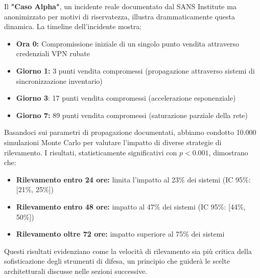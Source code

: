 Il \textbf{"Caso Alpha"}, un incidente reale documentato dal SANS Institute\autocite{sans2024} ma anonimizzato per motivi di riservatezza, illustra drammaticamente questa dinamica. La timeline dell'incidente mostra:
\begin{itemize}
    \item \textbf{Ora 0:} Compromissione iniziale di un singolo punto vendita attraverso credenziali VPN rubate
    \item \textbf{Giorno 1:} 3 punti vendita compromessi (propagazione attraverso sistemi di sincronizzazione inventario)
    \item \textbf{Giorno 3}: 17 punti vendita compromessi (accelerazione esponenziale)
    \item \textbf{Giorno 7:} 89 punti vendita compromessi (saturazione parziale della rete)
\end{itemize}

Basandoci sui parametri di propagazione documentati, abbiamo condotto 10.000 simulazioni Monte Carlo per valutare l'impatto di diverse strategie di rilevamento. I risultati, statisticamente significativi con $p < 0.001$, dimostrano che:
\begin{itemize}
    \item \textbf{Rilevamento entro 24 ore:} limita l'impatto al 23\% dei sistemi (IC 95\%: [21\%, 25\%])
    \item \textbf{Rilevamento entro 48 ore:} impatto al 47\% dei sistemi (IC 95\%: [44\%, 50\%])
    \item \textbf{Rilevamento oltre 72 ore:} impatto superiore al 75\% dei sistemi
\end{itemize}

Questi risultati evidenziano come la velocità di rilevamento sia più critica della sofisticazione degli strumenti di difesa, un principio che guiderà le scelte architetturali discusse nelle sezioni successive.

